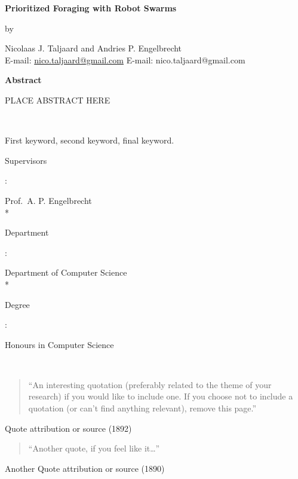\begin{center}
	{\large\bf Prioritized Foraging with Robot Swarms}
\end{center}
\begin{center}by\end{center}
\begin{center}
	{Nicolaas J. Taljaard and Andries P. Engelbrecht}\\
	\ifpdf
		E-mail: \href{mailto:nico.taljaard@gmail.com}{nico.taljaard@gmail.com}
	\else
		E-mail: nico.taljaard@gmail.com
	\fi
\end{center}
\vspace{1cm}

\begin{center}{\large\bf Abstract}\end{center}
PLACE ABSTRACT HERE

\noindent\

 First keyword, second keyword, final keyword.

\vfill
\noindent
{\bf\parbox{26.8mm}{Supervisors}:} Prof.~A. P. Engelbrecht \\* %
{\bf\parbox{26.8mm}{Department}:} Department of Computer Science \\*
{\bf\parbox{26.8mm}{Degree}:} Honours in Computer Science


\newpage

\ 

\begin{quotation}
``An interesting quotation (preferably related to the theme of your research) if you would like to include one. If you choose not to include a quotation (or can't find anything relevant), remove this page.''
\end{quotation}
\begin{flushright}
Quote attribution or source (1892)
\end{flushright}

\vspace{1cm}

\begin{quotation}
``Another quote, if you feel like it\ldots''
\end{quotation}
\begin{flushright}
Another Quote attribution or source (1890)
\end{flushright}

